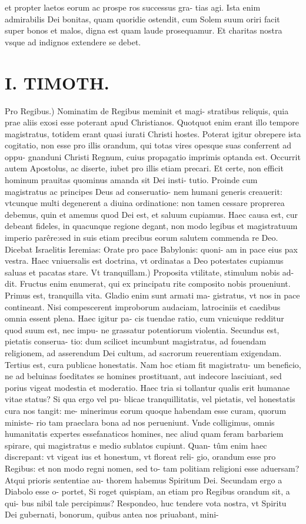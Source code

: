 \documentclass{article}
\begin{document}
\begin{pages}
et propter laetos eorum ac prospe ros successus gra- tias agi. Ista enim admirabilis Dei bonitas, quam quoridie ostendit, cum Solem suum oriri facit super bonos et malos, digna est quam laude prosequamur. Et charitas nostra vsque ad indignos extendere se debet.  \pend
\section*{I. TIMOTH. }
\marginpar{[ p.18 ]}\pstart Pro Regibus.) Nominatim de Regibus meminit et magi- stratibus reliquis, quia prae aliis exosi esse poterant apud Christianos. Quotquot enim erant illo tempore magistratus, totidem erant quasi iurati Christi hostes. Poterat igitur obrepere ista cogitatio, non esse pro illis orandum, qui totas vires opesque suas conferrent ad oppu- gnanduni Christi Regnum, cuius propagatio imprimis optanda est. Occurrit autem Apostolus, ac diserte, iubet pro illis etiam precari. Et certe, non efficit hominum prauitas quominus amanda sit Dei insti- tutio. Proinde cum magistratus ac principes Deus ad conseruatio- nem humani generis creauerit: vtcunque multi degenerent a diuina ordinatione: non tamen cessare proprerea debemus, quin et amemus quod Dei est, et saluum cupiamus. Haec causa est, cur debeant fideles, in quacunque regione degant, non modo legibus et magistratuum imperio parêre:sed in suis etiam precibus eorum salutem commenda re Deo. Dicebat Israelitis Ieremias: Orate pro pace Babylonis: quoni- am in pace eius pax vestra. Haec vniuersalis est doctrina, vt ordinatas a Deo potestates cupiamus saluas et pacatas stare.  \pend\pstart Vt tranquillam.) Proposita vtilitate, stimulum nobis ad- dit. Fructus enim enumerat, qui ex principatu rite composito nobis proueniunt. Primus est, tranquilla vita. Gladio enim sunt armati ma- gistratus, vt nos in pace contineant. Nisi compescerent improborum audaciam, latrociniis et caedibus omnia essent plena. Haec igitur pa- cis tuendae ratio, cum vnicuique redditur quod suum est, nec impu- ne grassatur potentiorum violentia. Secundus est, pietatis conserua- tio: dum scilicet incumbunt magistratus, ad fouendam religionem, ad asserendum Dei cultum, ad sacrorum reuerentiam exigendam. Tertius est, cura publicae honestatis. Nam hoc etiam fit magistratu- um beneficio, ne ad beluinas foeditates se homines prostituant, aut indecore lasciuiant, sed porius vigeat modestia et moderatio. Haec tria si tollantur qualis erit humanae vitae status? Si qua ergo vel pu- blicae tranquillitatis, vel pietatis, vel honestatis cura nos tangit: me- minerimus eorum quoque habendam esse curam, quorum ministe- rio tam praeclara bona ad nos perueniunt. Vnde colligimus, omnis humanitatis expertes essefanaticos homines, nec aliud quam feram barbariem spirare, qui magistratus e medio sublatos cupiunt. Quan- tûm enim haec discrepant: vt vigeat ius et honestum, vt floreat reli- gio, orandum esse pro Regibus: et non modo regni nomen, sed to- tam politiam religioni esse aduersam? Atqui prioris sententiae au- thorem habemus Spiritum Dei. Secundam ergo a Diabolo esse o- portet, Si roget quispiam, an etiam pro Regibus orandum sit, a qui- bus nibil tale percipimus? Respondeo, huc tendere vota nostra, vt Spiritu Dei gubernati, bonorum, quibus antea nos priuabant, mini-  \pend

\end{pages}
\end{document}
